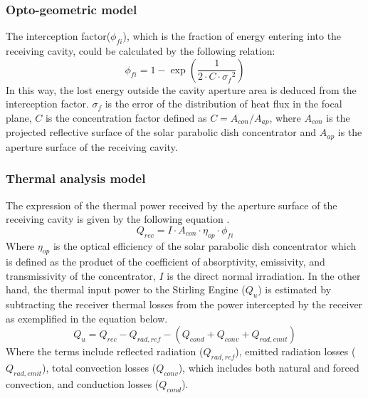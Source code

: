 \documentclass{ECOS_2019}
\begin{document}
\subsubsection{Opto-geometric model}
The interception factor($\phi_{fi}$), which is the fraction of energy entering into the receiving cavity, could be calculated by  the following relation\cite{Bensafi2010}:
\begin{equation}
    \phi_{fi}= 1 - \exp(\frac{1}{2\cdot C\cdot {\sigma_f}^2})
\end{equation}
In this way, the lost energy outside the cavity aperture area is deduced from the interception factor.
$\sigma_{f}$ is the error of the distribution of heat flux in the focal plane, $C$ is the concentration factor defined as $C=A_{con}/A_{ap}$, where $A_{con}$ is the projected reflective surface of the solar parabolic dish concentrator and $A_{ap}$ is the aperture surface of the receiving cavity.
\subsubsection{Thermal analysis model}
The expression of the thermal power received by the aperture surface of the receiving cavity is given by the following equation \cite{Ruelas2013}.
\begin{equation}
    Q_{rec}= I\cdot A_{con}\cdot \eta_{op} \cdot\phi_{fi}
\end{equation}
Where $\eta_{op}$ is the optical efficiency of the solar parabolic dish concentrator which is defined as the product of the coefficient of absorptivity, emissivity, and transmissivity of the concentrator, $I$ is the direct normal irradiation.
In the other hand, the thermal input power to the Stirling Engine ($Q_{u}$) is estimated by subtracting the receiver thermal losses from the power intercepted by the receiver as exemplified in the equation below\cite{Rekioua2019}.
\begin{equation}
    Q_{u}= Q_{rec}-Q_{rad,ref}-(Q_{cond}+Q_{conv}+Q_{rad,emit})
    \label{Eq_SE_in}
\end{equation}
Where the terms include reflected radiation ($Q_{rad,ref}$), emitted radiation losses ($Q_{rad,emit}$), total convection losses ($Q_{conv}$), which includes both natural and forced convection, and conduction losses ($Q_{cond}$).
\end{document}
